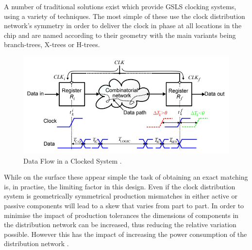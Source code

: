 \documentclass[12pt,english,british]{report}
\begin{document}
A number of traditional solutions exist which provide GSLS clocking systems, using a variety of techniques. The most simple of these use the clock distribution network's symmetry in order to deliver the clock in phase at all locations in the chip and are named according to their geometry with the main variants being branch-trees, X-trees or H-trees. %
\begin{figure}[h]
	\centering
	\includegraphics[scale=0.5]{../eldar_why_precise_clocking}
	\caption{Data Flow in a Clocked System \cite{zianbetov2013distributed}.}%
	\label{fig:trees}
\end{figure}
While on the surface these appear simple the task of obtaining an exact matching is, in practise, the limiting factor in this design. Even if the clock distribution system is geometrically symmetrical production mismatches in either active or passive components will lead to a skew that varies from part to part. In order to minimise the impact of production tolerances the dimensions of components in the distribution network can be increased, thus reducing the relative variation possible. However this has the impact of increasing the power consumption of the distribution network \cite{tiwari1998reducing}.
\end{document}
